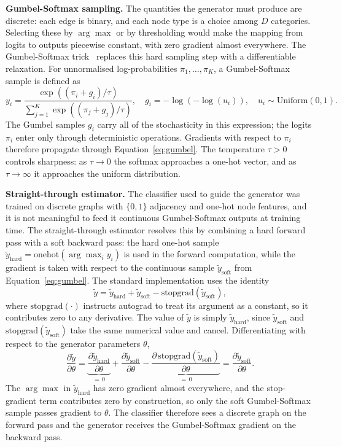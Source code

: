 \documentclass[12pt,a4paper]{article}
\begin{document}
\textbf{Gumbel-Softmax sampling.} The quantities the generator must produce are discrete: each edge is binary, and each node type is a choice among $D$ categories. Selecting these by $\arg\max$ or by thresholding would make the mapping from logits to outputs piecewise constant, with zero gradient almost everywhere. The Gumbel-Softmax trick~\cite{jang2017categorical} replaces this hard sampling step with a differentiable relaxation. For unnormalised log-probabilities $\pi_1, \ldots, \pi_K$, a Gumbel-Softmax sample is defined as
\begin{equation}
  y_i = \frac{\exp\!\left((\pi_i + g_i) / \tau\right)}{\sum_{j=1}^{K} \exp\!\left((\pi_j + g_j) / \tau\right)}, \quad g_i = -\log(-\log(u_i)), \quad u_i \sim \text{Uniform}(0,1).
  \label{eq:gumbel}
\end{equation}
The Gumbel samples $g_i$ carry all of the stochasticity in this expression; the logits $\pi_i$ enter only through deterministic operations. Gradients with respect to $\pi_i$ therefore propagate through Equation~\eqref{eq:gumbel}. The temperature $\tau > 0$ controls sharpness: as $\tau \to 0$ the softmax approaches a one-hot vector, and as $\tau \to \infty$ it approaches the uniform distribution.

\textbf{Straight-through estimator.} The classifier used to guide the generator was trained on discrete graphs with $\{0,1\}$ adjacency and one-hot node features, and it is not meaningful to feed it continuous Gumbel-Softmax outputs at training time. The straight-through estimator resolves this by combining a hard forward pass with a soft backward pass: the hard one-hot sample $\tilde{y}_\text{hard} = \text{onehot}(\arg\max_i y_i)$ is used in the forward computation, while the gradient is taken with respect to the continuous sample $\tilde{y}_\text{soft}$ from Equation~\eqref{eq:gumbel}. The standard implementation uses the identity
\[
  \tilde{y} = \tilde{y}_\text{hard} + \tilde{y}_\text{soft} - \text{stopgrad}(\tilde{y}_\text{soft}),
\]
where $\text{stopgrad}(\cdot)$ instructs autograd to treat its argument as a constant, so it contributes zero to any derivative. The value of $\tilde{y}$ is simply $\tilde{y}_\text{hard}$, since $\tilde{y}_\text{soft}$ and $\text{stopgrad}(\tilde{y}_\text{soft})$ take the same numerical value and cancel. Differentiating with respect to the generator parameters $\theta$,
\[
  \frac{\partial \tilde{y}}{\partial \theta} = \underbrace{\frac{\partial \tilde{y}_\text{hard}}{\partial \theta}}_{=\,0} + \frac{\partial \tilde{y}_\text{soft}}{\partial \theta} - \underbrace{\frac{\partial\,\text{stopgrad}(\tilde{y}_\text{soft})}{\partial \theta}}_{=\,0} = \frac{\partial \tilde{y}_\text{soft}}{\partial \theta}.
\]
The $\arg\max$ in $\tilde{y}_\text{hard}$ has zero gradient almost everywhere, and the stop-gradient term contributes zero by construction, so only the soft Gumbel-Softmax sample passes gradient to $\theta$. The classifier therefore sees a discrete graph on the forward pass and the generator receives the Gumbel-Softmax gradient on the backward pass.
\end{document}
